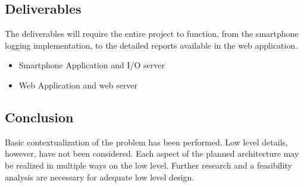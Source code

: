 \subsection{Deliverables}
The deliverables will require the entire project to function, from the smartphone logging implementation, to the detailed reports available in the web application. 
\begin{itemize}
\item Smartphone Application and I/O server
\item Web Application and web server
\end{itemize}

\subsection{Conclusion}
Basic contextualization of the problem has been performed.
Low level details, however, have not been considered.
Each aspect of the planned architecture may be realized in multiple ways on the low level.
Further research and a feasibility analysis are necessary for adequate low level design.

\pagebreak
